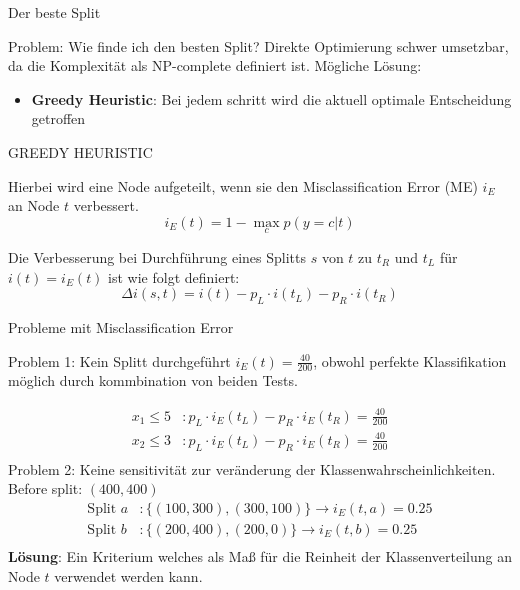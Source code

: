 \documentclass{beamer}
\begin{document}
\begin{frame}{Der beste Split}
\begin{alertblock}{Problem: Wie finde ich den besten Split?}
	Direkte Optimierung schwer umsetzbar, da die Komplexität als NP-complete definiert ist.
	Mögliche Lösung:
	
	\begin{itemize}
		\item { \textbf{Greedy Heuristic}: Bei jedem schritt wird die aktuell optimale Entscheidung getroffen}
	\end{itemize}

\end{alertblock}

\end{frame}


\begin{frame}{GREEDY HEURISTIC}

Hierbei wird eine Node aufgeteilt, wenn sie den Misclassification Error (ME) $i_E$ an Node $t$ verbessert.
   \[
   	i_E (t) = 1 - \max_c p(y = c | t)
   \]

Die Verbesserung bei Durchführung eines Splitts $s$ von $t$ zu $t_R$ und $t_L$ für $i(t) = i_E (t) $ ist wie folgt definiert: 
\[
	\Delta i(s, t) = i(t) - p_L \cdot i(t_L) - p_R \cdot i(t_R)
\]	

\end{frame}

\begin{frame}{Probleme mit Misclassification Error}

Problem 1: Kein Splitt durchgeführt $i_E (t) = \frac{40}{200}$, obwohl perfekte Klassifikation möglich durch kommbination von beiden Tests.

 \begin{align*}
 	x_1 \leq 5&: p_L \cdot i_E (t_L) - p_R \cdot i_E (t_R) = \frac{40}{200} \\
	x_2 \leq 3&: p_L \cdot i_E (t_L) - p_R \cdot i_E (t_R) = \frac{40}{200} \\
 \end{align*}
Problem 2:
Keine sensitivität zur veränderung der Klassenwahrscheinlichkeiten.
Before split: $(400, 400)$
 \begin{align*}
 	\text{Split } a &: \{(100,300), (300,100)\} \rightarrow i_E (t, a) = 0.25 \\
	\text{Split } b &: \{(200,400), (200,0)\} \rightarrow i_E (t, b) = 0.25 \\
 \end{align*}
 \textbf{Lösung}: Ein Kriterium welches als Maß für die Reinheit der Klassenverteilung an Node $t$ verwendet werden kann.
\end{frame}
\end{document}

